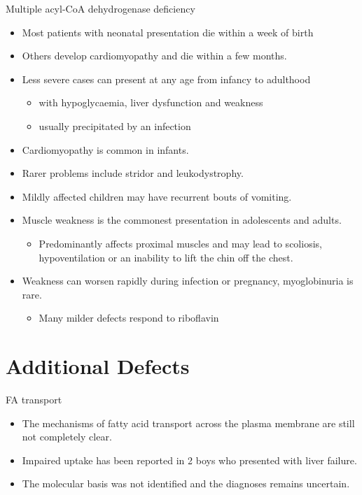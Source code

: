 \documentclass[presentation, smaller]{beamer}
\begin{document}
\begin{frame}[label={sec:orgheadline41}]{Multiple acyl-CoA dehydrogenase deficiency}
\begin{itemize}
\item Most patients with neonatal presentation die within a week of birth
\item Others develop cardiomyopathy and die within a few months.
\item Less severe cases can present at any age from infancy to adulthood
\begin{itemize}
\item with hypoglycaemia, liver dysfunction and weakness
\item usually precipitated by an infection
\end{itemize}
\item Cardiomyopathy is common in infants.
\item Rarer problems include stridor and leukodystrophy.
\item Mildly affected children may have recurrent bouts of vomiting.
\item Muscle weakness is the commonest presentation in adolescents and adults.
\begin{itemize}
\item Predominantly affects proximal muscles and may lead to scoliosis,
hypoventilation or an inability to lift the chin off the chest.
\end{itemize}
\item Weakness can worsen rapidly during infection or pregnancy, myoglobinuria is rare.
\begin{itemize}
\item Many milder defects respond to riboflavin
\end{itemize}
\end{itemize}
\end{frame}

\section{Additional Defects}
\label{sec:orgheadline45}
\begin{frame}[label={sec:orgheadline43}]{FA transport}
\begin{itemize}
\item The mechanisms of fatty acid transport across the plasma membrane are still not completely clear.
\item Impaired uptake has been reported in 2 boys who presented with liver failure.
\item The molecular basis was not identified and the diagnoses remains uncertain.
\end{itemize}
\end{frame}
\end{document}

